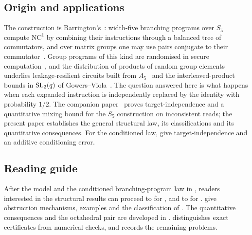 \subsection*{Origin and applications}
The construction is Barrington's~\cite{Bar89}: width-five branching
programs over $S_5$ compute $\mathrm{NC}^1$ by combining their instructions
through a balanced tree of commutators, and over matrix groups one may
use pairs conjugate to their commutator~\cite{Boneh2013}. Group programs
of this kind are randomised in secure computation~\cite{Kilian1988}, and
the distribution of products of random group elements underlies
leakage-resilient circuits built from $A_5$~\cite{MilesViola2013} and the
interleaved-product bounds in $\operatorname{SL}_2(q)$ of
Gowers--Viola~\cite{GowersViola2019}. The question answered here is what
happens when each expanded instruction is independently replaced by the
identity with probability $1/2$. The companion
paper~\cite{ZermenoS5} proves target-independence and a quantitative
mixing bound for the $S_5$ construction on inconsistent reads; the
present paper establishes the general structural law, its classifications
and its quantitative consequences. For the conditioned law,
 give target-independence and an
additive conditioning error.

\subsection*{Reading guide}
After the model and the conditioned branching-program law in ,
readers interested in the structural results can proceed to
 for , and to
 for .
 give obstruction mechanisms,
examples and the classification of .
The quantitative consequences and the octahedral pair are developed in
.
 distinguishes exact certificates from numerical
checks, and  records the remaining problems.

